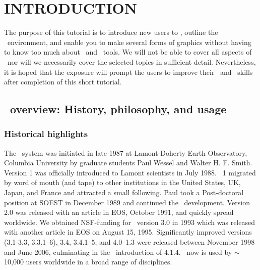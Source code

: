 \documentclass{report}
\begin{document}


\clearpage

\thispagestyle{headings}

\tableofcontents 
\thispagestyle{headings}

\chapter*{INTRODUCTION} 
\thispagestyle{headings}

The purpose of this tutorial is to introduce new users to \GMT,
outline the \GMT\ environment, and enable you to make several
forms of graphics without having to know too much about \UNIX\
and \UNIX\ tools.  We will not be able to cover all aspects of
\GMT\ nor will we necessarily cover the selected topics in
sufficient detail.  Nevertheless, it is hoped that the exposure
will prompt the users to improve their \GMT\ and \UNIX\ skills
after completion of this short tutorial.

\section*{\gmt\ overview: History, philosophy, and usage}

\subsection*{Historical highlights}

The \GMT\ system was initiated in late 1987 at Lamont-Doherty
Earth Observatory, Columbia University by graduate students Paul
Wessel and Walter H. F. Smith.  Version 1 was officially introduced
to Lamont scientists in July 1988.  \GMT\ 1 migrated by word of mouth
(and tape) to other institutions in the United States, UK, Japan, and
France and attracted a small following.  Paul took a Post-doctoral
position at SOEST in December 1989 and continued the \GMT\ development.
Version 2.0 was released with an article in EOS, October 1991, and
quickly spread worldwide.  We obtained NSF-funding for \GMT\
version 3.0 in 1993 which was released with another article in EOS
on August 15, 1995.  Significantly improved versions (3.1-3.3,
3.3.1--6), 3.4, 3.4.1--5, and 4.0--1.3 were released between November 1998 and
June 2006, culminating in the \GMTDOCDATE\ introduction of 4.1.4.
\GMT\ now is used by $\sim$10,000 users worldwide in a broad range of disciplines.
\end{document}
